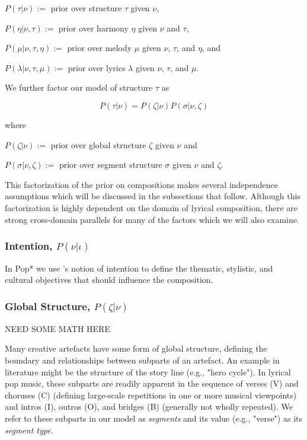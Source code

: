 \documentclass[letterpaper]{article}
\begin{document}
\(P(\tau|\nu):=\) prior over structure $\tau$ given $\nu$,

\(P(\eta|\nu,\tau):=\) prior over harmony $\eta$ given $\nu$ and $\tau$,

\(P(\mu|\nu,\tau,\eta):=\) prior over melody $\mu$ given $\nu$, $\tau$, and $\eta$, and

\(P(\lambda|\nu,\tau,\mu):=\) prior over lyrics $\lambda$ given $\nu$, $\tau$, and $\mu$.

We further factor our model of structure $\tau$ as

\[ P(\tau|\nu) = P(\zeta|\nu)P(\sigma|\nu,\zeta) \]

\noindent where 

\(P(\zeta|\nu):=\) prior over global structure $\zeta$ given $\nu$ and

\(P(\sigma|\nu,\zeta):=\) prior over segment structure $\sigma$ given $\nu$ and $\zeta$.

This factorization of the prior on compositions makes several independence assumptions which will be discussed in the subsections that follow. Although this factorization is highly dependent on the domain of lyrical composition, there are strong cross-domain parallels for many of the factors which we will also examine.

\subsubsection{Intention, $P(\nu|\iota)$}

In Pop* we use \cite{bay:inpress-a}'s notion of intention to define the thematic, stylistic, and cultural objectives that should influence the composition.

\subsubsection{Global Structure, $P(\zeta|\nu)$}

NEED SOME MATH HERE

Many creative artefacts have some form of global structure, defining the boundary and relationships between subparts of an artefact. An example in literature might be the structure of the story line (e.g., "hero cycle"). In lyrical pop music, these subparts are readily apparent in the sequence of verses (V) and choruses (C) (defining large-scale repetitions in one or more musical viewpoints) and intros (I), outros (O), and bridges (B) (generally not wholly repeated). We refer to these subparts in our model as \textit{segments} and its value (e.g., "verse") as its \textit{segment type}.
\end{document}
